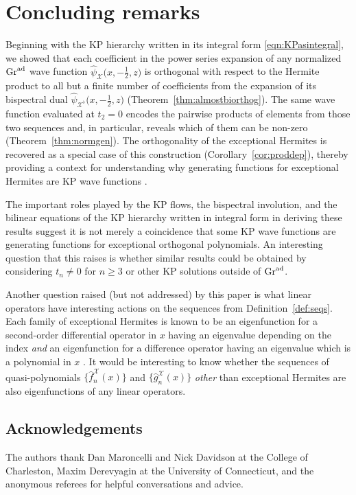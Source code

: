 \documentclass[pdftex]{sigma}
\numberwithin{equation}{section}
\theoremstyle{definition}
\def\X{\mathcal{X}}
\def\ff{\hat f}
\def\gg{\hat g}
\begin{document}
\section{Concluding remarks}

Beginning with the KP hierarchy written in its integral form
\eqref{eqn:KPasintegral}, we showed that each coefficient in the power
series expansion of any normalized ${\rm Gr}^{\rm ad}$ wave function
$\hat\psi_{\X}\bigl(x,-\tfrac{1}{2},z\bigr)$ is orthogonal with respect to the Hermite
product to all but a finite number of coefficients from the expansion
of its bispectral dual $\hat\psi_{\X^\flat}\bigl(x,-\tfrac{1}{2},z\bigr)$ (Theorem~\ref{thm:almostbiorthog}). The same wave
function evaluated at $t_2=0$ encodes the
pairwise products of elements from those two sequences and, in particular, reveals which of them can be
non-zero (Theorem~\ref{thm:normgen}). The orthogonality of
the exceptional Hermites is recovered as a special case of this
construction (Corollary~\ref{cor:proddep}), thereby providing
a context for understanding why generating
functions for exceptional Hermites are KP wave functions \cite{KasMil}.

The important roles played by the KP flows, the bispectral involution,
and the bilinear equations of the KP hierarchy written in integral
form in deriving these results suggest it is not merely a coincidence
that some KP wave functions are generating functions for exceptional
orthogonal polynomials. An interesting question that this raises is
whether similar results could be obtained by considering $t_n\not=0$
for $n\geq 3$ or other KP solutions outside of ${\rm Gr}^{\rm ad}$.

Another question raised (but not addressed) by this paper is what
linear operators have interesting actions on the sequences from Definition~\ref{def:seqs}.
Each family of exceptional Hermites is known to be an eigenfunction
for a second-order differential operator in $x$ having an eigenvalue
depending on the index \textit{and} an eigenfunction for a difference
operator having an eigenvalue which is a polynomial in $x$ \cite{XHermite2}. It would
be interesting to know whether the sequences of quasi-polynomials
$\big\{\ff_n^{\X}(x)\big\}$ and $\big\{\gg_n^{\X}(x)\big\}$ \textit{other} than
exceptional Hermites are also eigenfunctions of any linear operators.


\subsection*{Acknowledgements} The authors thank Dan
Maroncelli and Nick Davidson at the College of Charleston, Maxim
Derevyagin at the University of Connecticut, and the anonymous referees for helpful conversations and advice.
\end{document}
